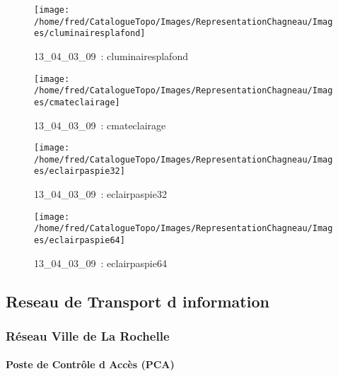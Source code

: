 \documentclass[12pt,titlepage]{book}
\begin{document}
\begin{figure}[h!]
\begin{minipage}[t]{3cm}
  \end{minipage}
  \begin{minipage}[t]{3cm}
    \begin{center}
      \texttt{[image: /home/fred/CatalogueTopo/Images/RepresentationChagneau/Images/cluminairesplafond]}
      \caption[~13\_04\_03\_09]{\small{13\_04\_03\_09~:} \tiny{cluminairesplafond}}\label{cluminairesplafond}
    \end{center}
  \end{minipage}
  \begin{minipage}[t]{3cm}
    \begin{center}
      \texttt{[image: /home/fred/CatalogueTopo/Images/RepresentationChagneau/Images/cmateclairage]}
      \caption[~13\_04\_03\_09]{\small{13\_04\_03\_09~:} \tiny{cmateclairage}}\label{cmateclairage}
    \end{center}
  \end{minipage}
  \begin{minipage}[t]{3cm}
    \begin{center}
      \texttt{[image: /home/fred/CatalogueTopo/Images/RepresentationChagneau/Images/eclairpaspie32]}
      \caption[~13\_04\_03\_09]{\small{13\_04\_03\_09~:} \tiny{eclairpaspie32}}\label{eclairpaspie32}
    \end{center}
  \end{minipage}
  \begin{minipage}[t]{3cm}
    \begin{center}
      \texttt{[image: /home/fred/CatalogueTopo/Images/RepresentationChagneau/Images/eclairpaspie64]}
      \caption[~13\_04\_03\_09]{\small{13\_04\_03\_09~:} \tiny{eclairpaspie64}}\label{eclairpaspie64}
    \end{center}
  \end{minipage}
\end{figure}
\subsection{Reseau de Transport d information}
\subsubsection{\large Réseau Ville de La Rochelle}
\paragraph{Poste de Contrôle d Accès (PCA)}
\noindent
\vspace{\baselineskip}
\end{document}

